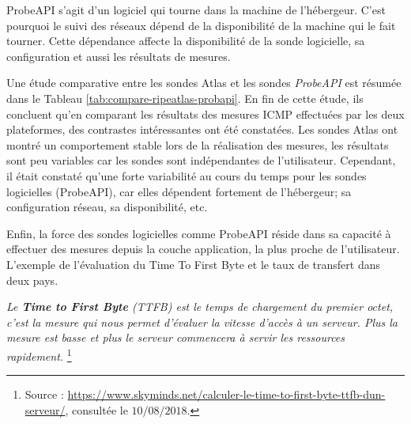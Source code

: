 ProbeAPI s'agit d'un logiciel qui tourne dans la machine de l'hébergeur. C'est pourquoi le suivi des réseaux dépend de la disponibilité de la machine qui le fait  tourner. Cette dépendance  affecte la disponibilité de la sonde logicielle, sa configuration et aussi les résultats de mesures.

Une étude comparative \cite{COMPARE-ATLAS-PROBEAPI}  entre les sondes  Atlas et les sondes \textit{ProbeAPI} est résumée dans le Tableau \ref{tab:compare-ripeatlas-probapi}. 
En fin de cette étude, ils concluent qu'en comparant les résultats des mesures ICMP effectuées par les deux plateformes, des contrastes intéressantes ont été constatées.  Les sondes Atlas ont montré un comportement stable lors de la réalisation  des mesures, les résultats sont peu variables car les sondes sont indépendantes de l'utilisateur. Cependant, il était constaté qu'une forte variabilité au cours du temps pour les sondes logicielles (ProbeAPI), car elles dépendent fortement de l'hébergeur; sa configuration réseau, sa disponibilité, etc.

Enfin, la force des sondes logicielles comme  ProbeAPI réside dans sa capacité  à effectuer des mesures depuis la couche application, la plus proche de l'utilisateur. L'exemple de l'évaluation du Time To First Byte et le taux de transfert dans deux pays.

\begin{tcolorbox}
	\og \textit{	Le \textbf{Time to First Byte} (TTFB) est le temps de chargement du premier octet, c'est la mesure qui nous permet d'évaluer la vitesse d'accès à un serveur. Plus la mesure est basse et plus le serveur commencera à servir les ressources rapidement.} \fg{} \footnote{Source : \url{https://www.skyminds.net/calculer-le-time-to-first-byte-ttfb-dun-serveur/}, consultée le $10/08/2018$.}
\end{tcolorbox}

